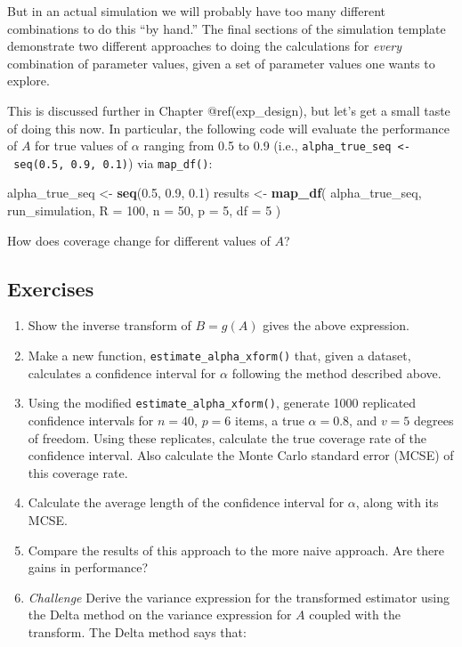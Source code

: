 \documentclass[
]{book}
\newenvironment{Shaded}{\begin{snugshade}}{\end{snugshade}}
\newcommand{\AttributeTok}[1]{\textcolor[rgb]{0.13,0.29,0.53}{#1}}
\newcommand{\DecValTok}[1]{\textcolor[rgb]{0.00,0.00,0.81}{#1}}
\newcommand{\FloatTok}[1]{\textcolor[rgb]{0.00,0.00,0.81}{#1}}
\newcommand{\FunctionTok}[1]{\textcolor[rgb]{0.13,0.29,0.53}{\textbf{#1}}}
\newcommand{\NormalTok}[1]{#1}
\newcommand{\OtherTok}[1]{\textcolor[rgb]{0.56,0.35,0.01}{#1}}
\begin{document}
But in an actual simulation we will probably have too many different combinations to do this ``by hand.''
The final sections of the simulation template demonstrate two different approaches to doing the calculations for \emph{every} combination of parameter values, given a set of parameter values one wants to explore.

This is discussed further in Chapter @ref(exp\_design), but let's get a small taste of doing this now.
In particular, the following code will evaluate the performance of \(A\) for true values of \(\alpha\) ranging from 0.5 to 0.9 (i.e., \texttt{alpha\_true\_seq\ \textless{}-\ seq(0.5,\ 0.9,\ 0.1)}) via \texttt{map\_df()}:

\begin{Shaded}
\begin{Highlighting}[]
\NormalTok{alpha\_true\_seq }\OtherTok{\textless{}{-}} \FunctionTok{seq}\NormalTok{(}\FloatTok{0.5}\NormalTok{, }\FloatTok{0.9}\NormalTok{, }\FloatTok{0.1}\NormalTok{)}
\NormalTok{results }\OtherTok{\textless{}{-}} \FunctionTok{map\_df}\NormalTok{( alpha\_true\_seq, }
\NormalTok{                   run\_simulation,}
                   \AttributeTok{R =} \DecValTok{100}\NormalTok{,}
                   \AttributeTok{n =} \DecValTok{50}\NormalTok{, }\AttributeTok{p =} \DecValTok{5}\NormalTok{, }\AttributeTok{df =} \DecValTok{5}\NormalTok{ )}
\end{Highlighting}
\end{Shaded}

How does coverage change for different values of \(A\)?

\subsection{Exercises}\label{exercises-7}

\begin{enumerate}
\def\labelenumi{\arabic{enumi}.}
\item
  Show the inverse transform of \(B = g(A)\) gives the above expression.
\item
  Make a new function, \texttt{estimate\_alpha\_xform()} that, given a dataset, calculates a confidence interval for \(\alpha\) following the method described above.
\item
  Using the modified \texttt{estimate\_alpha\_xform()}, generate 1000 replicated confidence intervals for \(n = 40\), \(p = 6\) items, a true \(\alpha = 0.8\), and \(v = 5\) degrees of freedom. Using these replicates, calculate the true coverage rate of the confidence interval. Also calculate the Monte Carlo standard error (MCSE) of this coverage rate.
\item
  Calculate the average length of the confidence interval for \(\alpha\), along with its MCSE.
\item
  Compare the results of this approach to the more naive approach. Are there gains in performance?
\item
  \emph{Challenge} Derive the variance expression for the transformed estimator using the Delta method on the variance expression for \(A\) coupled with the transform. The Delta method says that:
\end{enumerate}
\end{document}
